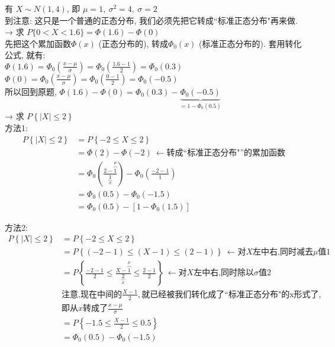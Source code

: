 \documentclass[UTF8]{ctexart}
\begin{document}
\begin{myEnvSample}
有 $X \sim N(1,4)$, 即 $\mu=1, \ \sigma^2=4,\ \sigma=2$ \\
到注意: 这只是一个普通的正态分布, 我们必须先把它转成``标准正态分布"再来做. \\

→ 求 $P\{0<X<1.6\} =\varPhi (1.6)-\varPhi (0)$ \\
先把这个累加函数$\Phi (x)$ (正态分布的), 转成$\Phi_0 (x)$ (标准正态分布的). 套用转化公式, 就有: \\
$	\varPhi (1.6)=\varPhi _0\left( \frac{x-\mu}{\sigma} \right) =\varPhi _0\left( \frac{1.6-1}{2} \right) =\varPhi _0(0.3)$ \\
$	\varPhi (0)=\varPhi _0\left( \frac{x-\mu}{\sigma} \right) =\varPhi _0\left( \frac{0-1}{2} \right) =\varPhi _0(-0.5)$ \\

所以回到原题, $
\varPhi (1.6)-\varPhi (0)=\varPhi _0(0.3)-\underset{=1-\varPhi _0(0.5)}{\underbrace{\varPhi _0(-0.5)}}
$ \\

→ 求 $P\left\{ |X|\leq 2 \right\} $ \\
方法1: 
\begin{align*}  %
	P\left\{ |X|\leq 2 \right\} &=P\left\{ -2\leq X\leq 2 \right\}\\
&=\varPhi \left( 2 \right) -\varPhi \left( -2 \right) \ \gets \text{转成} \text{``标准正态分布"}\text{的累加函数}\\
&=\varPhi _0\left( \frac{2-\overset{\mu}{\overbrace{1}}}{\underset{\sigma}{\underbrace{1}}} \right) -\varPhi _0\left( \frac{-2-1}{1} \right)\\
&=\varPhi _0\left( 0.5 \right) -\varPhi _0\left( -1.5 \right)\\
&=\varPhi _0\left( 0.5 \right) -\left[ 1-\varPhi _0\left( 1.5 \right) \right]
\end{align*} 

方法2: 
\begin{align*}  %
	P\left\{ |X|\leq 2 \right\}
&=P\left\{ -2\leq X\leq 2 \right\}\\
&=P\left\{ \left( -2-1 \right) \leq \left( X-1 \right) \leq \left( 2-1 \right) \right\} \ \gets \text{对}X\text{左中右,同时减去}\mu \text{值}1\\
&=P\left\{ \frac{-2-1}{2}\leq \frac{X-\overset{\mu}{\overbrace{1}}}{\underset{\sigma}{\underbrace{2}}}\leq \frac{2-1}{2} \right\} \ \gets \text{对}X\text{左中右,同时除以}\sigma \text{值}2\\
&\text{注意,现在中间的}\frac{X-1}{2},\text{就已经被我们转化成了``标准正态分布"的x形式了},\\
&\text{即从}x\text{转成了}\frac{x-\mu}{\sigma}\\
&=P\left\{ -1.5\leq \frac{X-1}{2}\leq 0.5 \right\}\\
&=\varPhi _0\left( 0.5 \right) -\varPhi _0\left( -1.5 \right)
\end{align*}

\end{myEnvSample}
\vspace{1em} 
\end{document}
